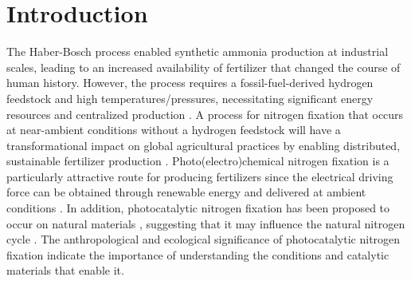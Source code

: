 \documentclass[journal=ascecg,manuscript=article,articletitle=true]{achemso}
\begin{document}
\section{Introduction}
The Haber-Bosch process enabled synthetic ammonia production at industrial scales, leading to an increased availability of fertilizer that changed the course of human history\cite{Smil_1999,Galloway_2004}. However, the process requires a fossil-fuel-derived hydrogen feedstock and high temperatures/pressures, necessitating significant energy resources and centralized production \cite{Uekoetter_2002}. A process for nitrogen fixation that occurs at near-ambient conditions without a hydrogen feedstock will have a transformational impact on global agricultural practices by enabling distributed, sustainable fertilizer production \cite{Allman_2017,Gilbert_2012}. Photo(electro)chemical nitrogen fixation is a particularly attractive route for producing fertilizers since the electrical driving force can be obtained through renewable energy and delivered at ambient conditions \cite{Giddey_2013}. In addition, photocatalytic nitrogen fixation has been proposed to occur on natural materials \cite{Dhar_1941,Schrauzer_1983}, suggesting that it may influence the natural nitrogen cycle \cite{Schrauzer_1983,Doane_2017}. The anthropological and ecological significance of photocatalytic nitrogen fixation indicate the importance of understanding the conditions and catalytic materials that enable it.
\end{document}
